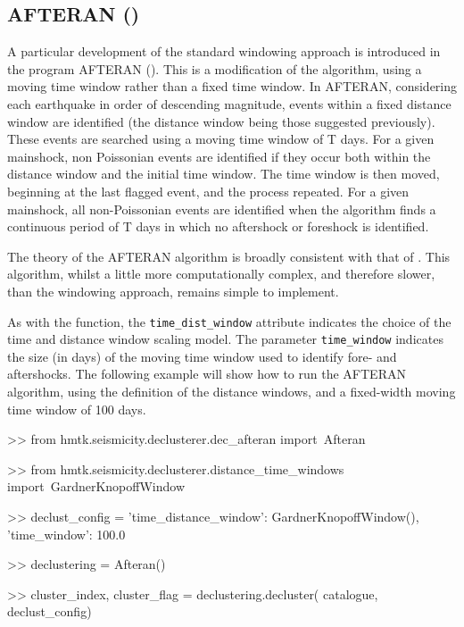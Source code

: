 \subsection{AFTERAN (\cite{Musson1999PSHABalkan})}

A particular development of the standard windowing approach is introduced in the program AFTERAN (\cite{Musson1999PSHABalkan}). This is a modification of the \cite{GardnerKnopoff1974} algorithm, using a moving time window rather than a fixed time window. In AFTERAN, considering each earthquake in order of descending magnitude, events within a fixed distance window are identified (the distance window being those suggested previously). These events are searched using a moving time window of T days. For a given mainshock, non Poissonian events are identified if they occur both within the distance window and the initial time window. The time window is then moved, beginning at the last flagged event, and the process repeated. For a given mainshock, all non-Poissonian events are identified when the algorithm finds a continuous period of T days in which no aftershock or foreshock is identified. 

The theory of the AFTERAN algorithm is broadly consistent with that of \cite{GardnerKnopoff1974}. This algorithm, whilst a little more computationally complex, and therefore slower, than the \cite{GardnerKnopoff1974} windowing approach, remains simple to implement. 

As with the \cite{GardnerKnopoff1974} function, the \verb=time_dist_window= attribute indicates the choice of the time and distance window scaling model. The parameter \verb=time_window= indicates the size (in days) of the moving time window used to identify fore- and aftershocks. The following example will show how to run the AFTERAN algorithm, using the  \cite{GardnerKnopoff1974} definition of the distance windows, and a fixed-width moving time window of 100 days.

  
\begin{python}[frame=single]

>> from hmtk.seismicity.declusterer.dec_afteran import\
    Afteran

>> from hmtk.seismicity.declusterer.distance_time_windows import\
    GardnerKnopoffWindow   
 
>> declust_config = {
    'time_distance_window': GardnerKnopoffWindow(),
    'time_window': 100.0} 

>> declustering = Afteran()

>> cluster_index, cluster_flag = declustering.decluster(
    catalogue,
    declust_config)
\end{python} 

